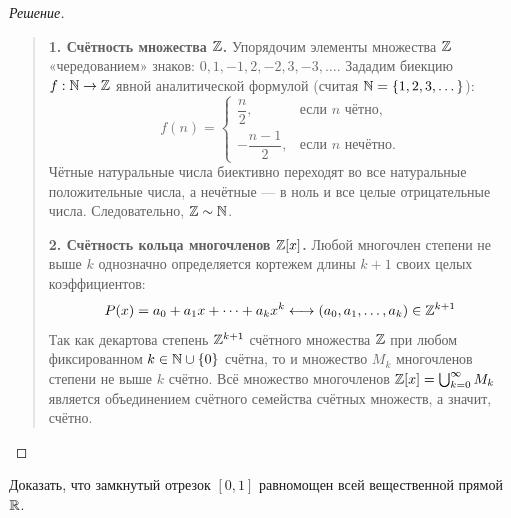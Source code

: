 \begin{proof}[Решение]~\\
    \begin{quote}
        \textbf{1. Счётность множества $\mathbb{Z}$.} 
        Упорядочим элементы множества $\mathbb{Z}$ «чередованием» знаков: 
        $0, 1, -1, 2, -2, 3, -3, \dots$. Зададим биекцию $f: \mathbb{N} \to \mathbb{Z}$ 
        явной аналитической формулой (считая $\mathbb{N} = \{1, 2, 3, \dots\}$):
        \begin{equation} \label{eq:bij_z}
            f(n) = 
            \begin{cases}
                \dfrac{n}{2}, & \text{если } n \text{ чётно}, \\[2mm]
                -\dfrac{n - 1}{2}, & \text{если } n \text{ нечётно}.
            \end{cases} \tag{9}
        \end{equation}
        Чётные натуральные числа биективно переходят во все натуральные 
        положительные числа, а нечётные --- в ноль и все целые 
        отрицательные числа. Следовательно, $\mathbb{Z} \sim \mathbb{N}$.

        \textbf{2. Счётность кольца многочленов $\mathbb{Z}[x]$.} 
        Любой многочлен степени не выше $k$ однозначно определяется 
        кортежем длины $k + 1$ своих целых коэффициентов:
        \[
            P(x) = a_0 + a_1 x + \dots + a_k x^k \longleftrightarrow 
            (a_0, a_1, \dots, a_k) \in \mathbb{Z}^{k+1}
        \]
        Так как декартова степень $\mathbb{Z}^{k+1}$ счётного множества $\mathbb{Z}$ при 
        любом фиксированном $k \in \mathbb{N} \cup \{0\}$ счётна, то и множество 
        $M_k$ многочленов степени не выше $k$ счётно. Всё множество 
        многочленов $\mathbb{Z}[x] = \bigcup_{k=0}^\infty M_k$ является 
        объединением счётного семейства счётных множеств, а значит, счётно.
    \end{quote}
\end{proof}

\begin{problem}
    Доказать, что замкнутый отрезок $[0, 1]$ равномощен всей вещественной 
    прямой $\mathbb{R}$.
\end{problem}

